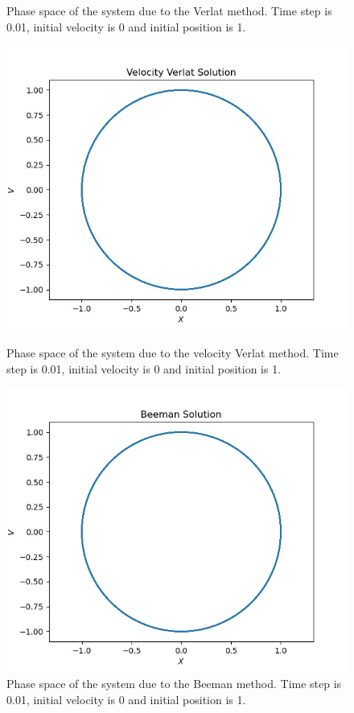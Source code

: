 \documentclass[12pt, a4paper]{article}
\begin{document}
\begin{figure}[h]
\begin{minipage}[b]{0.4\textwidth}
			\caption{Phase space of the system due to the Verlat method. Time step
			is 0.01, initial velocity is 0 and initial position is 1.}
			\label{fig:q2_phase_space_Verlat}
			\end{minipage}
			\hfill
			\begin{minipage}[b]{0.4\textwidth}
			\includegraphics[width=\textwidth]{../q2/q2_v_x_Velocity Verlat Solution_0_62.83185307179586_0.01_x0=1_v0=0.jpg}
			\caption{Phase space of the system due to the velocity Verlat method. Time step
			is 0.01, initial velocity is 0 and initial position is 1.}
			\label{fig:q2_phase_space_velocity_Verlat}
			\end{minipage}
			\hfill
			\begin{minipage}[b]{0.4\textwidth}
			\includegraphics[width=\textwidth]{../q2/q2_v_x_Beeman Solution_0_62.83185307179586_0.01_x0=1_v0=0.jpg}
			\caption{Phase space of the system due to the Beeman method. Time step
			is 0.01, initial velocity is 0 and initial position is 1.}
			\label{fig:q2_phase_space_Beeman}
			\end{minipage}
		\end{figure}
\end{document}
